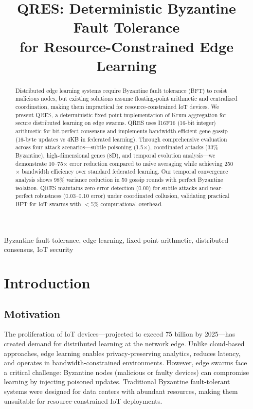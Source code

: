 \documentclass[conference,10pt]{IEEEtran}
\begin{document}
\title{QRES: Deterministic Byzantine Fault Tolerance\\for Resource-Constrained Edge Learning}

\author{
}

\maketitle

\begin{abstract}
Distributed edge learning systems require Byzantine fault tolerance (BFT) to resist malicious nodes, but existing solutions assume floating-point arithmetic and centralized coordination, making them impractical for resource-constrained IoT devices. We present QRES, a deterministic fixed-point implementation of Krum aggregation for secure distributed learning on edge swarms. QRES uses I16F16 (16-bit integer) arithmetic for bit-perfect consensus and implements bandwidth-efficient gene gossip (16-byte updates vs 4KB in federated learning). Through comprehensive evaluation across four attack scenarios---subtle poisoning (1.5$\times$), coordinated attacks (33\% Byzantine), high-dimensional genes (8D), and temporal evolution analysis---we demonstrate 10--75$\times$ error reduction compared to naive averaging while achieving 250$\times$ bandwidth efficiency over standard federated learning. Our temporal convergence analysis shows 98\% variance reduction in 50 gossip rounds with perfect Byzantine isolation. QRES maintains zero-error detection (0.00) for subtle attacks and near-perfect robustness (0.03--0.10 error) under coordinated collusion, validating practical BFT for IoT swarms with $<$5\% computational overhead.
\end{abstract}

\begin{IEEEkeywords}
Byzantine fault tolerance, edge learning, fixed-point arithmetic, distributed consensus, IoT security
\end{IEEEkeywords}

\section{Introduction}

\subsection{Motivation}
The proliferation of IoT devices---projected to exceed 75 billion by 2025---has created demand for distributed learning at the network edge. Unlike cloud-based approaches, edge learning enables privacy-preserving analytics, reduces latency, and operates in bandwidth-constrained environments. However, edge swarms face a critical challenge: Byzantine nodes (malicious or faulty devices) can compromise learning by injecting poisoned updates. Traditional Byzantine fault-tolerant systems were designed for data centers with abundant resources, making them unsuitable for resource-constrained IoT deployments.
\end{document}
